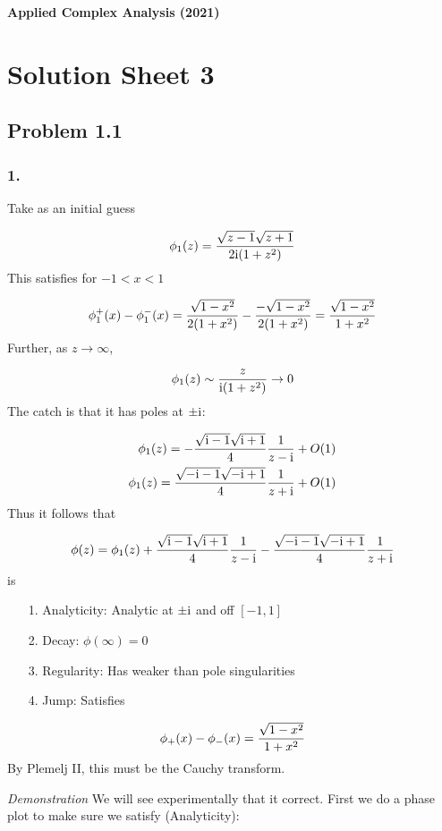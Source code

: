 \documentclass[12pt,a4paper]{article}
\def\I{ {\rm i} }
\begin{document}
\textbf{Applied Complex Analysis (2021)}

\section{Solution Sheet 3}
\subsection{Problem 1.1}
\subsubsection{1.}
Take as an initial guess

\[
 \phi_1(z) = {\sqrt{z-1} \sqrt{z+1}  \over 2\I(1 + z^2)}
\]
This satisfies for $-1 < x < 1$

\[
\phi_1^+(x) -\phi_1^-(x) = { \sqrt{1-x^2}  \over 2(1 + x^2)} -  {- \sqrt{1-x^2}  \over 2(1 + x^2)} = {\sqrt{1 - x^2} \over 1+x^2}
\]
Further, as $z \rightarrow \infty$,

\[
\phi_1(z) \sim {z \over \I(1+ z^2)} \rightarrow 0
\]
The catch is that it has poles at $\pm \I$:


\begin{align*}
    \phi_1(z) = -{\sqrt{\I -1} \sqrt{\I+1} \over 4} { 1 \over z - \I} + O(1)  \\
    \phi_1(z) = {\sqrt{-\I -1} \sqrt{-\I+1} \over 4} { 1 \over z + \I} + O(1)
\end{align*}
Thus it follows that

\[
\phi(z) =  \phi_1(z) + {\sqrt{\I -1} \sqrt{\I+1} \over 4} { 1 \over z - \I} - {\sqrt{-\I -1} \sqrt{-\I+1} \over 4} { 1 \over z + \I}
\]
is

\begin{itemize}
\item[1. ] Analyticity: Analytic at $\pm \I$ and off $[-1,1]$


\item[2. ] Decay: $\phi(\infty) = 0$


\item[3. ] Regularity: Has weaker than pole singularities


\item[4. ] Jump: Satisfies

\end{itemize}
\[
\phi_+(x) - \phi_-(x) = {\sqrt{1-x^2} \over 1+x^2}
\]
By Plemelj II, this must be the Cauchy transform.

\emph{Demonstration} We will see experimentally that it correct. First we do a phase plot to make sure we satisfy (Analyticity):
\end{document}
